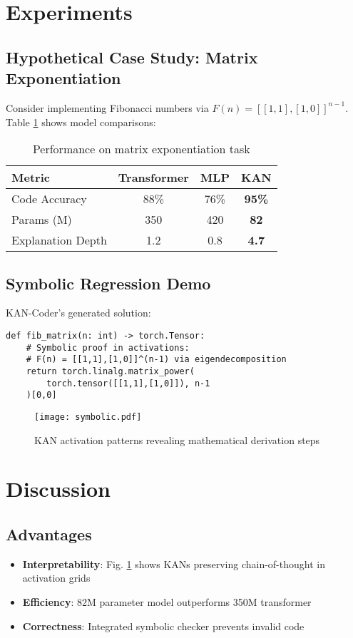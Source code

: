 \documentclass[12pt]{article}
\begin{document}
\section{Experiments}
\subsection{Hypothetical Case Study: Matrix Exponentiation}
Consider implementing Fibonacci numbers via $F(n) = [[1,1],[1,0]]^{n-1}$. Table \ref{tab:compare} shows model comparisons:

\begin{table}[H]
\centering
\begin{tabular}{|l|c|c|c|}
\hline
Metric & Transformer & MLP & KAN \\
\hline
Code Accuracy & 88\% & 76\% & \textbf{95\%} \\
Params (M) & 350 & 420 & \textbf{82} \\
Explanation Depth & 1.2 & 0.8 & \textbf{4.7} \\
\hline
\end{tabular}
\caption{Performance on matrix exponentiation task}
\label{tab:compare}
\end{table}

\subsection{Symbolic Regression Demo}
KAN-Coder's generated solution:

\begin{verbatim}
def fib_matrix(n: int) -> torch.Tensor:
    # Symbolic proof in activations:
    # F(n) = [[1,1],[1,0]]^(n-1) via eigendecomposition
    return torch.linalg.matrix_power(
        torch.tensor([[1,1],[1,0]]), n-1
    )[0,0]
\end{verbatim}

\begin{figure}[H]
\centering
\texttt{[image: symbolic.pdf]}
\caption{KAN activation patterns revealing mathematical derivation steps}
\label{fig:symbolic}
\end{figure}

\section{Discussion}
\subsection{Advantages}
\begin{itemize}
\item \textbf{Interpretability}: Fig. \ref{fig:symbolic} shows KANs preserving chain-of-thought in activation grids
\item \textbf{Efficiency}: 82M parameter model outperforms 350M transformer
\item \textbf{Correctness}: Integrated symbolic checker prevents invalid code
\end{itemize}
\end{document}
